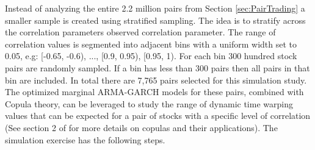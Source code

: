 \documentclass[12pt]{report}
\begin{document}
Instead of analyzing the entire 2.2 million pairs from Section \ref{sec:PairTrading} a smaller sample is created using stratified sampling. The idea is to stratify across the correlation parameters observed correlation parameter. The range of correlation values is segmented into adjacent bins with a uniform width set to 0.05, e.g: [-0.65, -0.6), ..., [0.9, 0.95), [0.95, 1). For each bin 300 hundred stock pairs are randomly sampled. If a bin has less than 300 pairs then all pairs in that bin are included. In total there are 7,765 pairs selected for this simulation study. The optimized marginal ARMA-GARCH models for these pairs, combined with Copula theory, can be leveraged to study the range of dynamic time warping values that can be expected for a pair of stocks with a specific level of correlation (See section 2 of \cite{DowiakTV-COP} for more details on copulas and their applications). The simulation exercise has the following steps.
\end{document}
